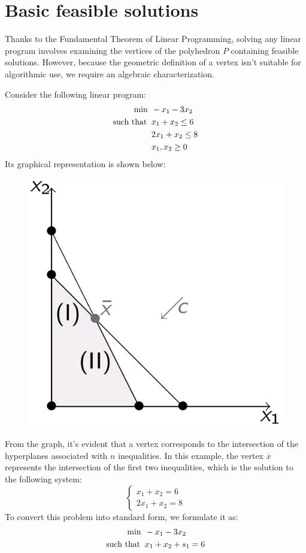 \documentclass[12pt, a4paper]{report}
\begin{document}
    \section{Basic feasible solutions}
    Thanks to the Fundamental Theorem of Linear Programming, solving any linear program involves examining the vertices of the polyhedron $P$ containing feasible solutions.
    However, because the geometric definition of a vertex isn't suitable for algorithmic use, we require an algebraic characterization.
    \begin{example}
        Consider the following linear program:
        \begin{align*}
            \min                      \:&\: -x_1-3x_2          \\
            \textnormal{such that }     &\: x_1+x_2 \leq 6  \\
                                        &\: 2x_1+x_2 \leq 8  \\
                                        &\: x_1,x_2 \geq 0
        \end{align*}
        Its graphical representation is shown below:
        \begin{figure}[H]
            \centering
            \includegraphics[width=0.25\linewidth]{images/lp.png}
        \end{figure}
        From the graph, it's evident that a vertex corresponds to the intersection of the hyperplanes associated with $n$ inequalities. 
        In this example, the vertex $\overline{x}$ represents the intersection of the first two inequalities, which is the solution to the following system:
        \[
        \begin{cases}
            x_1+x_2=6 \\
            2x_1+x_2=8
        \end{cases}
        \]
        To convert this problem into standard form, we formulate it as:
        \begin{align*}
            \min                      \:&\: -x_1-3x_2          \\
            \textnormal{such that }     &\: x_1+x_2+s_1 = 6  \\

\end{align*}
\end{example}
\end{document}
